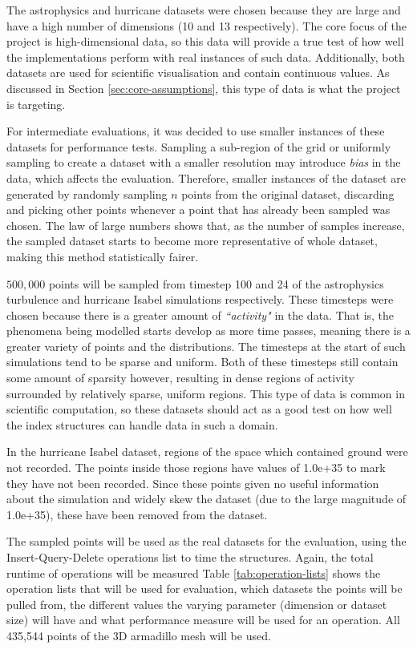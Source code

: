 The astrophysics and hurricane datasets were chosen because they are large and have a high number of dimensions (10 and 13 respectively). The core focus of the project is high-dimensional data, so this data will provide a true test of how well the implementations perform with real instances of such data. Additionally, both datasets are used for scientific visualisation and contain continuous values. As discussed in Section \ref{sec:core-assumptions}, this type of data is what the project is targeting.

For intermediate evaluations, it was decided to use smaller instances of these datasets for performance tests. Sampling a sub-region of the grid or uniformly sampling to create a dataset with a smaller resolution may introduce \textit{bias} in the data, which affects the evaluation. Therefore, smaller instances of the dataset are generated by randomly sampling $n$ points from the original dataset, discarding and picking other points whenever a point that has already been sampled was chosen. The law of large numbers \cite{large-sample-theory} shows that, as the number of samples increase, the sampled dataset starts to become more representative of whole dataset, making this method statistically fairer.

$500,000$ points will be sampled from timestep 100 and 24 of the astrophysics turbulence and hurricane Isabel simulations respectively. These timesteps were chosen because there is a greater amount of \textit{``activity"} in the data. That is, the phenomena being modelled starts develop as more time passes, meaning there is a greater variety of points and the distributions. The timesteps at the start of such simulations tend to be sparse and uniform. Both of these timesteps still contain some amount of sparsity however, resulting in dense regions of activity surrounded by relatively sparse, uniform regions. This type of data is common in scientific computation, so these datasets should act as a good test on how well the index structures can handle data in such a domain.

In the hurricane Isabel dataset, regions of the space which contained ground were not recorded. The points inside those regions have values of 1.0e+35 to mark they have not been recorded. Since these points given no useful information about the simulation and widely skew the dataset (due to the large magnitude of 1.0e+35), these have been removed from the dataset.

The sampled points will be used as the real datasets for the evaluation, using the Insert-Query-Delete operations list to time the structures. Again, the total runtime of operations will be measured Table \ref{tab:operation-lists} shows the operation lists that will be used for evaluation, which datasets the points will be pulled from, the different values the varying parameter (dimension or dataset size) will have and what performance measure will be used for an operation. All 435,544 points of the 3D armadillo mesh will be used.

